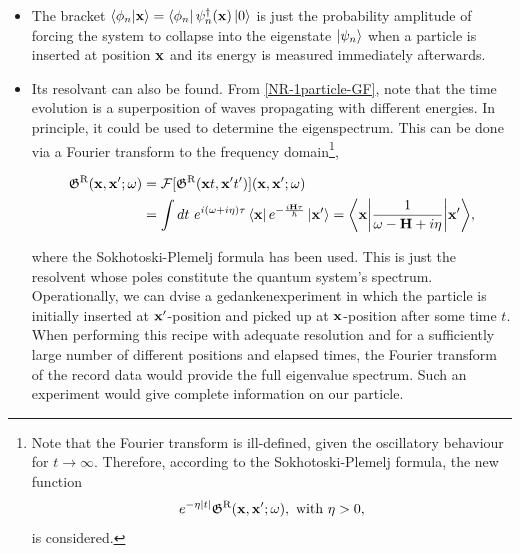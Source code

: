 \documentclass{homework}
\begin{document}
\begin{itemize}
    \item The bracket $\bra{\phi_n}\ket{{\bf x}} = \bra{\phi_n} \psi_n^\dagger({\bf x}) \ket{0}$ is just the probability amplitude of forcing the system to collapse into the eigenstate $\ket{\psi_n}$ when a particle is inserted at position ${\bf x}$ and its energy is measured immediately afterwards. \\
    \item Its resolvant can also be found. From \cref{NR-1particle-GF}, note that the time evolution is a superposition of waves propagating with different energies. In principle, it could be used to determine the eigenspectrum. This can be done via a Fourier transform to the frequency domain\footnote{Note that the Fourier transform is ill-defined, given the oscillatory behaviour for $t \rightarrow \infty$. Therefore, according to the Sokhotoski-Plemelj formula, the new function
        $$
            e^{-\eta |t| }\mathfrak{G}^{\textnormal{R}}({\bf x}, {\bf x}'; \omega), \textnormal{ with } \eta > 0,
        $$
        is considered.},
    
    \begin{equation}
    \begin{split}
        \mathfrak{G}^{\textnormal{R}}({\bf x}, {\bf x}'; \omega) &= \mathcal{F}[        \mathfrak{G}^{\textnormal{R}}({\bf x}t, {\bf x}'t')]({\bf x}, {\bf x}'; \omega) \\
        &= \int dt \textnormal{ } e^{i(\omega + i \eta) \tau} \bra{{\bf x}} e^{-\frac{i {\bf H} \tau}{\hbar}} \ket{{\bf x}'} = \bigg\langle {\bf x} \bigg| \frac{1}{\omega - {\bf H} + i \eta} \bigg| {{\bf x}'}\bigg\rangle,
    \end{split}
    \end{equation}
    
    where the Sokhotoski-Plemelj formula has been used. This is just the resolvent whose poles constitute the quantum system's spectrum. \\
    
    Operationally, we can dvise a gedankenexperiment in which the particle is initially inserted at ${\bf x}'$-position and picked up at ${\bf x}$-position after some time $t$. When performing this recipe with adequate resolution and for a sufficiently large number of different positions and elapsed times, the Fourier transform of the record data would provide the full eigenvalue spectrum. Such an experiment would give complete information on our particle. 
\end{itemize}
\end{document}
